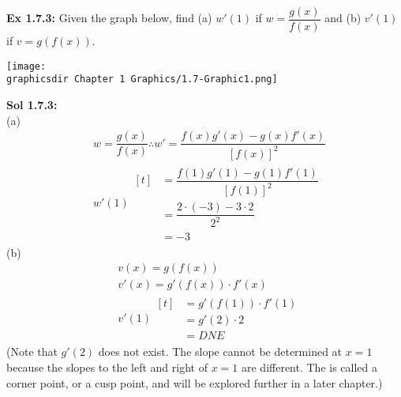 \begin{tcolorbox}[example]
    \textbf{Ex 1.7.3: } Given the graph below, find (a) $w'(1)$ if $w = \dfrac{g(x)}{f(x)}$ and (b) $v'(1)$ if $v = g(f(x))$. \\

    \begin{center}
        \texttt{[image: \\graphicsdir Chapter 1 Graphics/1.7-Graphic1.png]}
    \end{center}
\end{tcolorbox}
\begin{tcolorbox}[solution]
    \textbf{Sol 1.7.3: } \\[11pt]
    (a) \begin{align*}
        & w = \dfrac{g(x)}{f(x)} \therefore w' = \dfrac{f(x)g'(x) - g(x)f'(x)}{[f(x)]^2} \\[11pt]
        & w'(1) \begin{aligned}[t]
            & = \dfrac{f(1)g'(1) - g(1)f'(1)}{[f(1)]^2} \\[11pt]
            & = \dfrac{2 \cdot (-3) - 3 \cdot 2}{2^2} \\[11pt]
            & = \boxed{-3}
        \end{aligned}
    \end{align*}
    (b) \begin{align*}
        & v(x) = g(f(x)) \\[11pt]
        & v'(x) = g'(f(x)) \cdot f'(x) \\[11pt]
        & v'(1) \begin{aligned}[t]
            & = g'(f(1)) \cdot f'(1) \\[11pt]
            & = g'(2) \cdot 2 \\[11pt]
            & = \boxed{DNE}
        \end{aligned}
    \end{align*}
    (Note that $g'(2)$ does not exist. The slope cannot be determined at $x = 1$ because the slopes to the left and right of $x = 1$ are different. The is called a corner point, or a cusp point, and will be explored further in a later chapter.)
\end{tcolorbox} \vspace{11pt}

